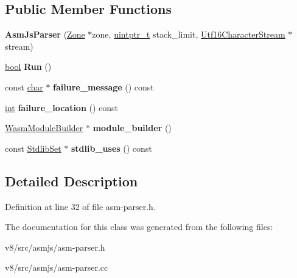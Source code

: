 \subsection*{Public Member Functions}
\begin{DoxyCompactItemize}
\item 
\mbox{\label{classv8_1_1internal_1_1wasm_1_1AsmJsParser_a9b35d4f3b50412465974bc052966529f}} 
{\bfseries Asm\+Js\+Parser} (\mbox{\hyperlink{classv8_1_1internal_1_1Zone}{Zone}} $\ast$zone, \mbox{\hyperlink{classuintptr__t}{uintptr\+\_\+t}} stack\+\_\+limit, \mbox{\hyperlink{classv8_1_1internal_1_1Utf16CharacterStream}{Utf16\+Character\+Stream}} $\ast$stream)
\item 
\mbox{\label{classv8_1_1internal_1_1wasm_1_1AsmJsParser_ad1d96db8bfbd7797bdb97e8075ef6783}} 
\mbox{\hyperlink{classbool}{bool}} {\bfseries Run} ()
\item 
\mbox{\label{classv8_1_1internal_1_1wasm_1_1AsmJsParser_ae24bc9e2e2e8d9a53cbf6e46d424808c}} 
const \mbox{\hyperlink{classchar}{char}} $\ast$ {\bfseries failure\+\_\+message} () const
\item 
\mbox{\label{classv8_1_1internal_1_1wasm_1_1AsmJsParser_a04a959bee325af65f6ff814d6fba2b36}} 
\mbox{\hyperlink{classint}{int}} {\bfseries failure\+\_\+location} () const
\item 
\mbox{\label{classv8_1_1internal_1_1wasm_1_1AsmJsParser_accd592651b4b13e6fa3a1c73391178c3}} 
\mbox{\hyperlink{classv8_1_1internal_1_1wasm_1_1WasmModuleBuilder}{Wasm\+Module\+Builder}} $\ast$ {\bfseries module\+\_\+builder} ()
\item 
\mbox{\label{classv8_1_1internal_1_1wasm_1_1AsmJsParser_a9dcf2c8a7d0463adc0454ecd0d9e8249}} 
const \mbox{\hyperlink{classv8_1_1internal_1_1EnumSet}{Stdlib\+Set}} $\ast$ {\bfseries stdlib\+\_\+uses} () const
\end{DoxyCompactItemize}


\subsection{Detailed Description}


Definition at line 32 of file asm-\/parser.\+h.



The documentation for this class was generated from the following files\+:\begin{DoxyCompactItemize}
\item 
v8/src/asmjs/asm-\/parser.\+h\item 
v8/src/asmjs/asm-\/parser.\+cc\end{DoxyCompactItemize}
